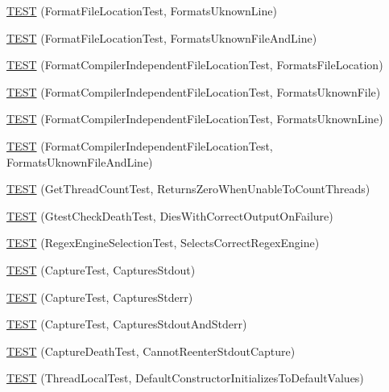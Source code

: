 \begin{DoxyCompactItemize}
\item 
\hyperlink{namespacetesting_1_1internal_a17d1f472b6c1154de7b5b008b964ee32}{T\+E\+ST} (Format\+File\+Location\+Test, Formats\+Uknown\+Line)
\item 
\hyperlink{namespacetesting_1_1internal_a1195aaf7258c5442de7aebd95acefb9f}{T\+E\+ST} (Format\+File\+Location\+Test, Formats\+Uknown\+File\+And\+Line)
\item 
\hyperlink{namespacetesting_1_1internal_a9c12f8c1ebb19906e8fa0c430d139076}{T\+E\+ST} (Format\+Compiler\+Independent\+File\+Location\+Test, Formats\+File\+Location)
\item 
\hyperlink{namespacetesting_1_1internal_a65ad1cad17717c1b8ac4c2d4bef5e079}{T\+E\+ST} (Format\+Compiler\+Independent\+File\+Location\+Test, Formats\+Uknown\+File)
\item 
\hyperlink{namespacetesting_1_1internal_a0315a64a661f249628f2884080e0614f}{T\+E\+ST} (Format\+Compiler\+Independent\+File\+Location\+Test, Formats\+Uknown\+Line)
\item 
\hyperlink{namespacetesting_1_1internal_a8b9aee556f3dec6e67c35830ba55e0bd}{T\+E\+ST} (Format\+Compiler\+Independent\+File\+Location\+Test, Formats\+Uknown\+File\+And\+Line)
\item 
\hyperlink{namespacetesting_1_1internal_a5ad8299ae9325382f01b945f4f81711e}{T\+E\+ST} (Get\+Thread\+Count\+Test, Returns\+Zero\+When\+Unable\+To\+Count\+Threads)
\item 
\hyperlink{namespacetesting_1_1internal_afabff70df09a0e4fcda96dd36460c2b9}{T\+E\+ST} (Gtest\+Check\+Death\+Test, Dies\+With\+Correct\+Output\+On\+Failure)
\item 
\hyperlink{namespacetesting_1_1internal_a198f7132f76dd44d48dac54dc5d38fbb}{T\+E\+ST} (Regex\+Engine\+Selection\+Test, Selects\+Correct\+Regex\+Engine)
\item 
\hyperlink{namespacetesting_1_1internal_a0b658d88cea3a2fe6775b1b269c0204b}{T\+E\+ST} (Capture\+Test, Captures\+Stdout)
\item 
\hyperlink{namespacetesting_1_1internal_abbc9510a4f690912c32835213d95198f}{T\+E\+ST} (Capture\+Test, Captures\+Stderr)
\item 
\hyperlink{namespacetesting_1_1internal_a341ff65f3ca44b27fc51f03a9a05bee8}{T\+E\+ST} (Capture\+Test, Captures\+Stdout\+And\+Stderr)
\item 
\hyperlink{namespacetesting_1_1internal_a325a786fb22b87e5aa8d8f584b42ab09}{T\+E\+ST} (Capture\+Death\+Test, Cannot\+Reenter\+Stdout\+Capture)
\item 
\hyperlink{namespacetesting_1_1internal_af366e28e373f36480decc2ea586f48f0}{T\+E\+ST} (Thread\+Local\+Test, Default\+Constructor\+Initializes\+To\+Default\+Values)

\end{DoxyCompactItemize}

